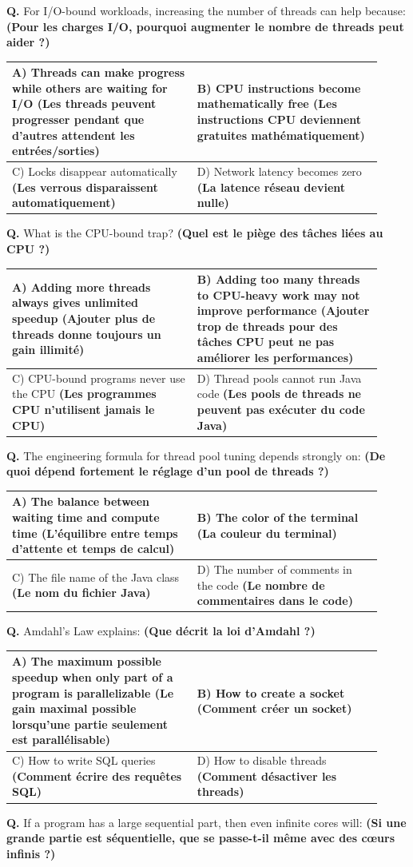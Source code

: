 \documentclass[11pt,a4paper]{article}
\newcounter{qnum}
\newcommand{\Q}{%
	\stepcounter{qnum}%
	\noindent\textbf{Q\theqnum. }%
}
\newcommand{\choices}[4]{%
	\setlength{\tabcolsep}{4pt}%
	\renewcommand{\arraystretch}{1.15}%
	\begin{tabular}{|p{0.46\linewidth}|p{0.46\linewidth}|}
		\hline
		A) #1 & B) #2 \\ \hline
		C) #3 & D) #4 \\ \hline
	\end{tabular}%
}
\begin{document}
\Q For I/O-bound workloads, increasing the number of threads can help because: \textbf{(Pour les charges I/O, pourquoi augmenter le nombre de threads peut aider ?) }

\choices
{Threads can make progress while others are waiting for I/O \textbf{(Les threads peuvent progresser pendant que d’autres attendent les entrées/sorties)}}
{CPU instructions become mathematically free \textbf{(Les instructions CPU deviennent gratuites mathématiquement)}}
{Locks disappear automatically \textbf{(Les verrous disparaissent automatiquement)}}
{Network latency becomes zero \textbf{(La latence réseau devient nulle)}}

\Q What is the CPU-bound trap? \textbf{(Quel est le piège des tâches liées au CPU ?) }

\choices
{Adding more threads always gives unlimited speedup \textbf{(Ajouter plus de threads donne toujours un gain illimité)}}
{Adding too many threads to CPU-heavy work may not improve performance \textbf{(Ajouter trop de threads pour des tâches CPU peut ne pas améliorer les performances)}}
{CPU-bound programs never use the CPU \textbf{(Les programmes CPU n’utilisent jamais le CPU)}}
{Thread pools cannot run Java code \textbf{(Les pools de threads ne peuvent pas exécuter du code Java)}}

\Q The engineering formula for thread pool tuning depends strongly on: \textbf{(De quoi dépend fortement le réglage d’un pool de threads ?) }

\choices
{The balance between waiting time and compute time \textbf{(L’équilibre entre temps d’attente et temps de calcul)}}
{The color of the terminal \textbf{(La couleur du terminal)}}
{The file name of the Java class \textbf{(Le nom du fichier Java)}}
{The number of comments in the code \textbf{(Le nombre de commentaires dans le code)}}

\Q Amdahl's Law explains: \textbf{(Que décrit la loi d’Amdahl ?) }

\choices
{The maximum possible speedup when only part of a program is parallelizable \textbf{(Le gain maximal possible lorsqu’une partie seulement est parallélisable)}}
{How to create a socket \textbf{(Comment créer un socket)}}
{How to write SQL queries \textbf{(Comment écrire des requêtes SQL)}}
{How to disable threads \textbf{(Comment désactiver les threads)}}

\Q If a program has a large sequential part, then even infinite cores will: \textbf{(Si une grande partie est séquentielle, que se passe-t-il même avec des cœurs infinis ?) }
\end{document}

